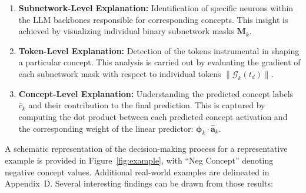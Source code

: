 \documentclass[letterpaper]{article} %
\begin{document}
\begin{enumerate}
\item \textbf{Subnetwork-Level Explanation:} Identification of specific neurons within the LLM backbones responsible for corresponding concepts. This insight is achieved by visualizing individual binary subnetwork masks
$\bm{M}_k$.
\item \textbf{Token-Level Explanation:} Detection of the tokens instrumental in shaping a particular concept. This analysis is carried out by evaluating the gradient of each subnetwork mask with respect to individual tokens $\|\mathcal{G}_k(t_d)\|$.
\item \textbf{Concept-Level Explanation:} Understanding the predicted concept labels $\hat{c}_k$ and their contribution to the final prediction. This is captured by computing the dot product between each predicted concept activation and the corresponding weight of the linear predictor: $\bm{\phi}_k\cdot\hat{\bm{a}}_k$.
\end{enumerate}
A schematic representation of the decision-making process for a representative example is provided in Figure~\ref{fig:example}, with ``Neg Concept'' denoting negative concept values. Additional real-world examples are delineated in Appendix~D. Several interesting findings can be drawn from those results:
\end{document}
